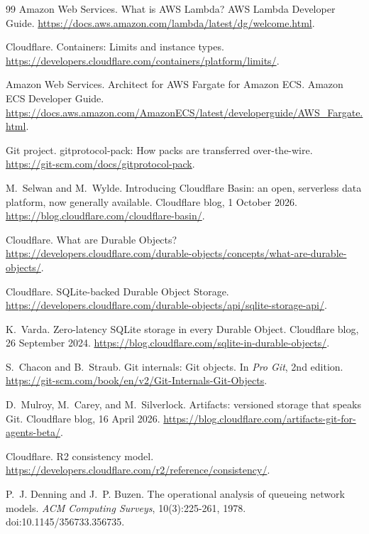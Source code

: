 \documentclass[11pt,letterpaper]{article}
\theoremstyle{definition}
\theoremstyle{remark}
\begin{document}
\begin{thebibliography}{99}
Amazon Web Services.
\newblock What is AWS Lambda?
\newblock AWS Lambda Developer Guide.
\newblock \url{https://docs.aws.amazon.com/lambda/latest/dg/welcome.html}.

Cloudflare.
\newblock Containers: Limits and instance types.
\newblock \url{https://developers.cloudflare.com/containers/platform/limits/}.

Amazon Web Services.
\newblock Architect for AWS Fargate for Amazon ECS.
\newblock Amazon ECS Developer Guide.
\newblock \url{https://docs.aws.amazon.com/AmazonECS/latest/developerguide/AWS_Fargate.html}.

Git project.
\newblock gitprotocol-pack: How packs are transferred over-the-wire.
\newblock \url{https://git-scm.com/docs/gitprotocol-pack}.

M.~Selwan and M.~Wylde.
\newblock Introducing {Cloudflare Basin}: an open, serverless data platform, now generally available.
\newblock Cloudflare blog, 1 October 2026.
\newblock \url{https://blog.cloudflare.com/cloudflare-basin/}.

Cloudflare.
\newblock What are Durable Objects?
\newblock \url{https://developers.cloudflare.com/durable-objects/concepts/what-are-durable-objects/}.

Cloudflare.
\newblock SQLite-backed Durable Object Storage.
\newblock \url{https://developers.cloudflare.com/durable-objects/api/sqlite-storage-api/}.

K.~Varda.
\newblock Zero-latency {SQLite} storage in every {Durable Object}.
\newblock Cloudflare blog, 26 September 2024.
\newblock \url{https://blog.cloudflare.com/sqlite-in-durable-objects/}.

S.~Chacon and B.~Straub.
\newblock Git internals: Git objects.
\newblock In \emph{Pro Git}, 2nd edition.
\newblock \url{https://git-scm.com/book/en/v2/Git-Internals-Git-Objects}.

D.~Mulroy, M.~Carey, and M.~Silverlock.
\newblock Artifacts: versioned storage that speaks {Git}.
\newblock Cloudflare blog, 16 April 2026.
\newblock \url{https://blog.cloudflare.com/artifacts-git-for-agents-beta/}.

Cloudflare.
\newblock R2 consistency model.
\newblock \url{https://developers.cloudflare.com/r2/reference/consistency/}.

P.~J. Denning and J.~P. Buzen.
\newblock The operational analysis of queueing network models.
\newblock \emph{ACM Computing Surveys}, 10(3):225-261, 1978.
\newblock doi:10.1145/356733.356735.


\end{thebibliography}
\end{document}
